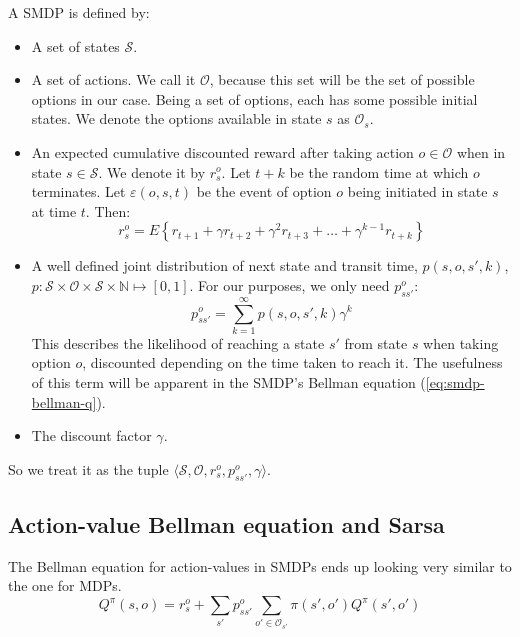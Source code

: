 A \ac{SMDP} is defined by:
\begin{itemize}
  \item A set of states $\mathcal{S}$.
  \item A set of actions. We call it $\mathcal{O}$, because this set will be the
    set of possible options in our case. Being a set of options, each has some
    possible initial states. We denote the options available in state $s$ as
$\mathcal{O}_s$.
  \item An expected cumulative discounted reward after taking action $o \in
    \mathcal{O}$ when in state $s \in \mathcal{S}$. We denote it by $r^o_s$. Let
    $t+k$ be the random time at which $o$ terminates. Let $\varepsilon(o, s, t)$
    be the event of option $o$ being initiated in state $s$ at time $t$. Then:
    \begin{equation}
      r^o_s = E\left\{ r_{t+1} + \gamma r_{t+2} + \gamma^2 r_{t+3} + \dots
      + \gamma^{k-1} r_{t+k} \right\}
    \end{equation}
  \item A well defined joint distribution of next state and transit time, $p(s,
    o, s', k)$, $p : \mathcal{S} \times \mathcal{O} \times \mathcal{S} \times
    \mathbb{N} \mapsto [0, 1]$. For our purposes, we only need $p^o_{ss'}$:
    \begin{equation}
      p^o_{ss'} = \sum_{k=1}^\infty p(s, o, s', k) \gamma^k
    \end{equation}
    This describes the likelihood of reaching a state $s'$ from state $s$ when
    taking option $o$, discounted depending on the time taken to reach it. The
    usefulness of this term will be apparent in the \ac{SMDP}'s Bellman equation
  (\ref{eq:smdp-bellman-q}).
  \item The discount factor $\gamma$.
\end{itemize}

So we treat it as the tuple $\langle \mathcal{S}, \mathcal{O}, r^o_s, p^o_{ss'},
\gamma\rangle$.

\subsection{Action-value Bellman equation and Sarsa}
The Bellman equation for action-values in \acp{SMDP} ends up looking very
similar to the one for \acp{MDP}.
\begin{equation}
  Q^\pi(s, o) = r^o_s + \sum_{s'}p^o_{ss'} \sum_{o' \in \mathcal{O}_{s'}} \pi(s', o')Q^\pi(s', o')
  \label{eq:smdp-bellman-q}
\end{equation}

